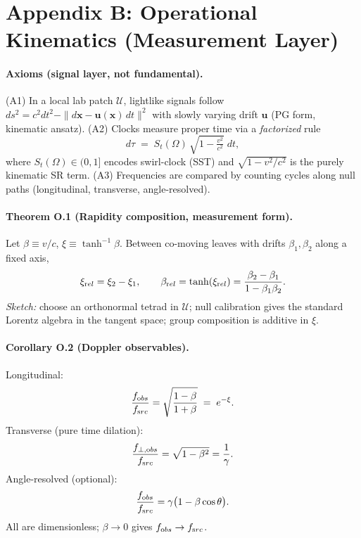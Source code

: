 \documentclass[11pt]{article}
\begin{document}

\section*{Appendix B: Operational Kinematics (Measurement Layer)}

		\paragraph{Axioms (signal layer, not fundamental).}
		(A1) In a local lab patch $\mathcal U$, lightlike signals follow $ds^2 = c^2 dt^2 - \|d\mathbf x - \mathbf u(\mathbf x)\,dt\|^2$
		with slowly varying drift $\mathbf u$ (PG form, kinematic ansatz).
		(A2) Clocks measure proper time via a \emph{factorized} rule
		\[
			d\tau \;=\; S_t(\Omega)\,\sqrt{1-\tfrac{v^2}{c^2}}\;dt,
		\]
		where $S_t(\Omega)\in(0,1]$ encodes swirl-clock (SST) and $\sqrt{1-v^2/c^2}$ is the purely kinematic SR term.
		(A3) Frequencies are compared by counting cycles along null paths (longitudinal, transverse, angle-resolved).

		\paragraph{Theorem O.1 (Rapidity composition, measurement form).}
		Let $\beta \equiv v/c$, $\xi \equiv \tanh^{-1}\!\beta$. Between co-moving leaves with drifts $\beta_1,\beta_2$ along a fixed axis,
		\[
			\xi_{\textrm rel}=\xi_2-\xi_1,
			\qquad
			\beta_{\textrm rel}=\tanh(\xi_{\textrm rel})=\frac{\beta_2-\beta_1}{1-\beta_1\beta_2}.
		\]
		\emph{Sketch:} choose an orthonormal tetrad in $\mathcal U$; null calibration gives the standard Lorentz algebra in the tangent space; group composition is additive in $\xi$.

		\paragraph{Corollary O.2 (Doppler observables).}
		Longitudinal:
		\[
			\frac{f_{\textrm obs}}{f_{\textrm src}}=\sqrt{\frac{1-\beta}{1+\beta}} \;=\; e^{-\xi}.
		\]
		Transverse (pure time dilation):
		\[
			\frac{f_{\perp,{\textrm obs}}}{f_{\textrm src}}=\sqrt{1-\beta^2}=\frac{1}{\gamma}.
		\]
		Angle-resolved (optional):
		\[
			\frac{f_{\textrm obs}}{f_{\textrm src}}=\gamma\bigl(1-\beta\cos\theta\bigr).
		\]
		All are dimensionless; $\beta\to 0$ gives $f_{\textrm obs}\to f_{\textrm src}$.
\end{document}
